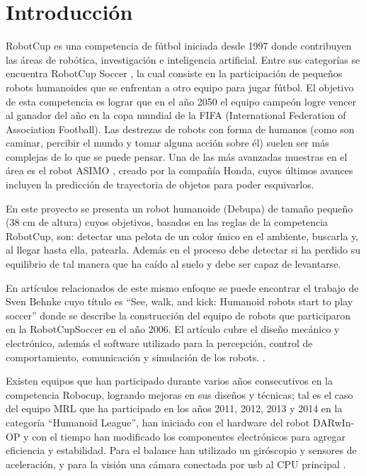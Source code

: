 \chapter*{Introducción}


\label{sect:justificacion}
RobotCup \cite{robotcup} es una competencia de fútbol iniciada desde 1997 donde contribuyen las áreas de robótica, investigación e inteligencia artificial. Entre sus categorías se encuentra RobotCup Soccer \cite{robotcupsoccer}, la cual consiste en la participación de pequeños robots humanoides que se enfrentan a otro equipo para jugar fútbol. El objetivo de esta competencia es lograr que en el año 2050 el equipo campeón logre vencer al ganador del año en la copa mundial de la FIFA (International Federation of Association Football). Las destrezas de robots con forma de humanos (como son caminar, percibir el mundo y tomar alguna acción sobre él) suelen ser más complejas de lo que se puede pensar. Una de las más avanzadas muestras en el área es el robot ASIMO \cite{asimo}, creado por la compañía Honda, cuyos últimos avances incluyen la predicción de trayectoria de objetos para poder esquivarlos.

En este proyecto se presenta un robot humanoide (Debupa) de tamaño pequeño (38 cm de altura) cuyos objetivos, basados en las reglas de la competencia RobotCup, son: detectar una pelota de un color único en el ambiente, buscarla y, al llegar hasta ella, patearla. Además en el proceso debe detectar si ha perdido su equilibrio de tal manera que ha caído al suelo y debe ser capaz de levantarse.

En artículos relacionados de este mismo enfoque se puede encontrar el trabajo de Sven Behnke cuyo título es “See, walk, and kick: Humanoid robots start to play soccer” donde se describe la construcción del equipo de robots que participaron en la RobotCupSoccer en el a\~no 2006. El artículo cubre el diseño mecánico y electrónico, además el software utilizado para la percepción, control de comportamiento, comunicación y simulación de los robots. \cite{paper}.

Existen equipos que han participado durante varios años consecutivos en la competencia Robocup, logrando mejoras en sus diseños y técnicas; tal es el caso del equipo MRL que ha participado en los años 2011, 2012, 2013 y 2014 en la categoría “Humanoid League”, han iniciado con el hardware del robot DARwIn-OP y con el tiempo han modificado los componentes electrónicos para agregar eficiencia y estabilidad. Para el balance han utilizado un giróscopio y sensores de aceleración, y para la visión una cámara conectada por usb al CPU principal \cite{paper1}.

